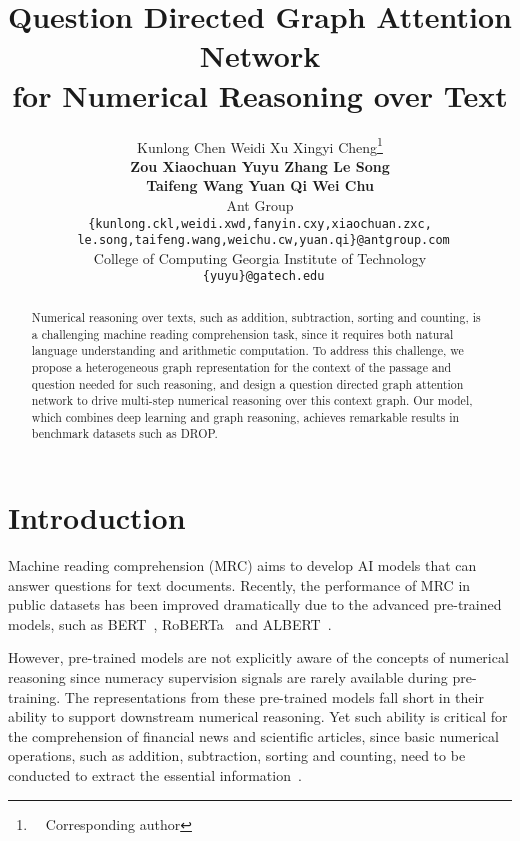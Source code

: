 \documentclass{article}
\title{Question Directed Graph Attention Network \\ for Numerical Reasoning over Text}
\author{Kunlong Chen \quad Weidi Xu \quad Xingyi Cheng\thanks{~~Corresponding author}     \\ { \bf  Zou Xiaochuan \quad Yuyu Zhang \quad Le Song } \\ {\bf Taifeng Wang \quad Yuan Qi  \quad Wei Chu } \\
 Ant Group \\
{\tt  \{kunlong.ckl,weidi.xwd,fanyin.cxy,xiaochuan.zxc,} \\
{\tt
le.song,taifeng.wang,weichu.cw,yuan.qi\}@antgroup.com} \\
 College of Computing Georgia Institute of Technology \\
{\tt
\{yuyu\}@gatech.edu}
}
\date{}
\begin{document}
\maketitle

\begin{abstract}
Numerical reasoning over texts, such as addition, subtraction, sorting and counting, is a challenging machine reading comprehension task, since it requires both natural language understanding and arithmetic computation. 
To address this challenge, we propose a heterogeneous graph representation for the context of the passage and question needed for such reasoning, and design a question directed graph attention network to drive multi-step numerical reasoning over this context graph. 
Our model, which combines deep learning and graph reasoning, achieves remarkable results in benchmark datasets such as DROP. 

\end{abstract}

\section{Introduction}

\setlength{\abovedisplayskip}{4pt}
\setlength{\abovedisplayshortskip}{1pt}
\setlength{\belowdisplayskip}{4pt}
\setlength{\belowdisplayshortskip}{1pt}






Machine reading comprehension (MRC) aims to develop AI models that can answer questions for text documents. 
Recently, the performance of MRC in public datasets has been improved dramatically due to the advanced pre-trained models, such as BERT~\cite{devlin-etal-2019-bert}, RoBERTa~\cite{DBLP:journals/corr/abs-1907-11692} and ALBERT~\cite{DBLP:journals/corr/abs-1909-11942}.

However, pre-trained models are not explicitly aware of the concepts of numerical reasoning since numeracy supervision signals are rarely available during pre-training. 
The representations from these pre-trained models fall short in their ability to support downstream numerical reasoning.  
Yet such ability is critical for the comprehension of financial news and scientific articles, since basic numerical operations, such as addition, subtraction, sorting and counting, need to be conducted to extract the essential information~\cite{DBLP:conf/naacl/DuaWDSS019}.
\end{document}
